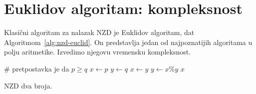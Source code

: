 \section{Euklidov algoritam: kompleksnost}
Klasični algoritam za nalazak NZD je Euklidov algoritam, dat Algoritmom~\ref{alg:nzd-euclid}. On predstavlja jedan od najpoznatijih algoritama u polju aritmetike. Izvedimo njegovu vremensku kompleksnost. 

\begin{algorithm}
	\begin{algorithmic}[1]
		  \# pretpostavka je da $p \geq  q$
		\State $x \gets p$ 
		\State $y \gets q$
		\State $ x \gets y  $
		\State $y \gets x \% y $
		\EndWhile
		\State \Return $x$
		\EndProcedure
	\end{algorithmic}   \caption{NZD dva broja.} \label{alg:nzd-euclid}
\end{algorithm}

